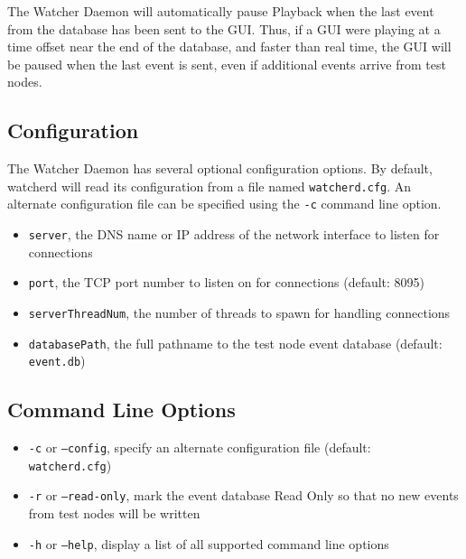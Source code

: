 The Watcher Daemon will automatically pause Playback when the last event from
the database has been sent to the GUI.  Thus, if a GUI were playing at a time
offset near the end of the database, and faster than real time, the GUI will be
paused when the last event is sent, even if additional events arrive from test
nodes.

\subsection{Configuration}

The Watcher Daemon has several optional configuration options.  By default,
watcherd will read its configuration from a file named {\tt watcherd.cfg}.  An
alternate configuration file can be specified using the {\tt -c} command line
option.

\begin{itemize}
\item {\tt server}, the DNS name or IP address of the network interface to listen for
connections
\item {\tt port}, the TCP port number to listen on for connections (default: 8095)
\item {\tt serverThreadNum}, the number of threads to spawn for handling connections
\item {\tt databasePath}, the full pathname to the test node event database (default:
{\tt event.db})
\end{itemize}

\subsection{Command Line Options}

\begin{itemize}
\item {\tt -c} or {\tt --config}, specify an alternate configuration file (default: {\tt
watcherd.cfg})
\item {\tt -r} or {\tt --read-only}, mark the event database Read Only so that no
new events from test nodes will be written
\item {\tt -h} or {\tt --help}, display a list of all supported command line
options
\end{itemize}

